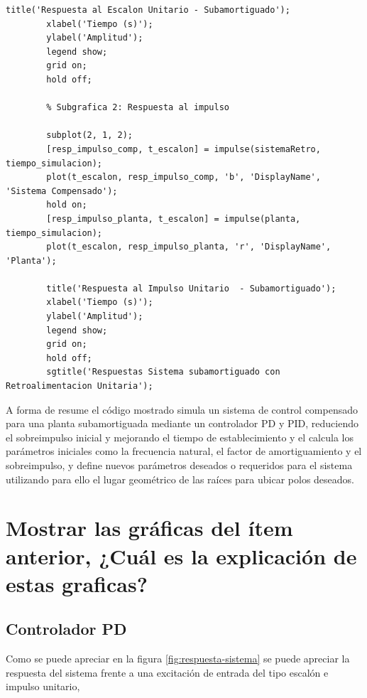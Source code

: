 \documentclass[conference]{IEEEtran}
\begin{document}
\begin{lstlisting}[numbers=none, caption={Controlador PID}]
		title('Respuesta al Escalon Unitario - Subamortiguado');
		xlabel('Tiempo (s)');
		ylabel('Amplitud');
		legend show;
		grid on; 
		hold off;
		
		% Subgrafica 2: Respuesta al impulso
		
		subplot(2, 1, 2); 
		[resp_impulso_comp, t_escalon] = impulse(sistemaRetro, tiempo_simulacion);
		plot(t_escalon, resp_impulso_comp, 'b', 'DisplayName', 'Sistema Compensado');
		hold on;
		[resp_impulso_planta, t_escalon] = impulse(planta, tiempo_simulacion);
		plot(t_escalon, resp_impulso_planta, 'r', 'DisplayName', 'Planta');
		
		title('Respuesta al Impulso Unitario  - Subamortiguado');
		xlabel('Tiempo (s)');
		ylabel('Amplitud'); 
		legend show;
		grid on; 
		hold off;
		sgtitle('Respuestas Sistema subamortiguado con Retroalimentacion Unitaria');
	\end{lstlisting}
	
	A forma de resume el código mostrado simula un sistema de control compensado para una planta subamortiguada mediante un controlador PD y PID, reduciendo el sobreimpulso inicial y mejorando el tiempo de establecimiento y el calcula los parámetros iniciales como la frecuencia natural, el factor de amortiguamiento y el sobreimpulso, y define nuevos parámetros deseados o requeridos para el sistema utilizando para ello el lugar geométrico de las raíces para ubicar polos deseados.
	
	\section{Mostrar las gráficas del ítem anterior, ¿Cuál es la explicación de estas graficas?}
	\subsection{Controlador PD}
	Como se puede apreciar en la figura \ref{fig:respuesta-sistema} se puede apreciar la respuesta del sistema frente a una excitación de entrada del tipo escalón e impulso unitario, 
	
\end{document}
